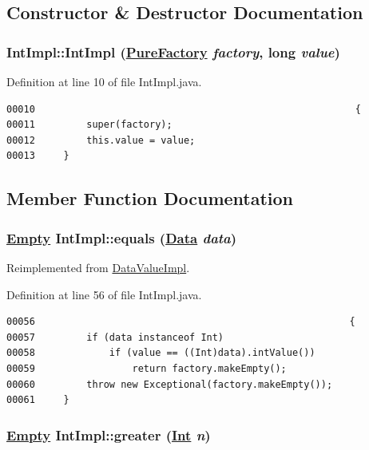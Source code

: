 \subsection{Constructor \& Destructor Documentation}
\hypertarget{classIntImpl_b0}{
\subsubsection[IntImpl]{\setlength{\rightskip}{0pt plus 5cm}Int\-Impl::Int\-Impl (\hyperlink{classPureFactory}{Pure\-Factory} {\em factory}, long {\em value})}}
\label{classIntImpl_b0}




Definition at line 10 of file Int\-Impl.java.\footnotesize\begin{verbatim}00010                                                        {
00011         super(factory);
00012         this.value = value;
00013     }
\end{verbatim}\normalsize 


\subsection{Member Function Documentation}
\hypertarget{classIntImpl_a9}{
\subsubsection[equals]{\setlength{\rightskip}{0pt plus 5cm}\hyperlink{interfaceEmpty}{Empty} Int\-Impl::equals (\hyperlink{interfaceData}{Data} {\em data})}}
\label{classIntImpl_a9}




Reimplemented from \hyperlink{classDataValueImpl_a5}{Data\-Value\-Impl}.

Definition at line 56 of file Int\-Impl.java.\footnotesize\begin{verbatim}00056                                                       {
00057         if (data instanceof Int) 
00058             if (value == ((Int)data).intValue())
00059                 return factory.makeEmpty();
00060         throw new Exceptional(factory.makeEmpty());
00061     }
\end{verbatim}\normalsize 
\hypertarget{classIntImpl_a5}{
\subsubsection[greater]{\setlength{\rightskip}{0pt plus 5cm}\hyperlink{interfaceEmpty}{Empty} Int\-Impl::greater (\hyperlink{interfaceInt}{Int} {\em n})}}
\label{classIntImpl_a5}




